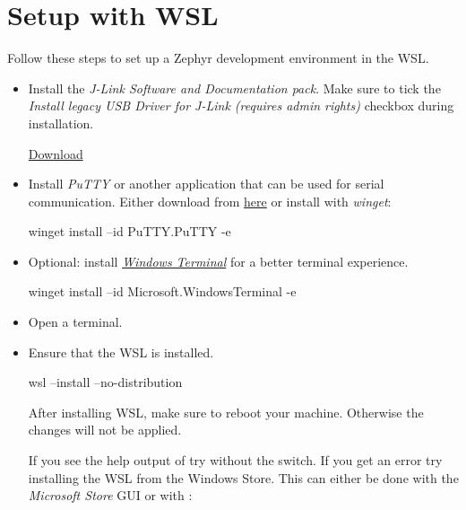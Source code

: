 \section{Setup with WSL}

Follow these steps to set up a Zephyr development environment in the WSL.

\begin{itemize}
  \item Install the \emph{J-Link Software and Documentation pack}.
    Make sure to tick the \emph{Install legacy USB Driver for J-Link (requires admin rights)} checkbox during installation.

    \href{https://www.segger.com/downloads/jlink/JLink_Windows_x86_64.exe}{Download}

  \item Install \emph{PuTTY} or another application that can be used for serial
    communication.
    Either download from \href{https://putty.org/}{here} or install with \emph{winget}:

        \begin{monobox}
winget install --id PuTTY.PuTTY -e
\end{monobox}

  \item Optional: install \href{https://aka.ms/terminal}{\emph{Windows Terminal}} for a better terminal experience.

        \begin{monobox}
winget install --id Microsoft.WindowsTerminal -e
\end{monobox}

  \item Open a terminal.

  \item Ensure that the WSL is installed.
        \begin{monobox}
wsl --install --no-distribution
\end{monobox}

    \begin{infobox}
      After installing WSL, make sure to reboot your machine.
      Otherwise the changes will not be applied.
    \end{infobox}

    \begin{infobox}
      If you see the help output of  try without the  switch.
      If you get an error try installing the WSL from the Windows Store.
      This can either be done with the \emph{Microsoft Store} GUI or with :


\end{infobox}
\end{itemize}
